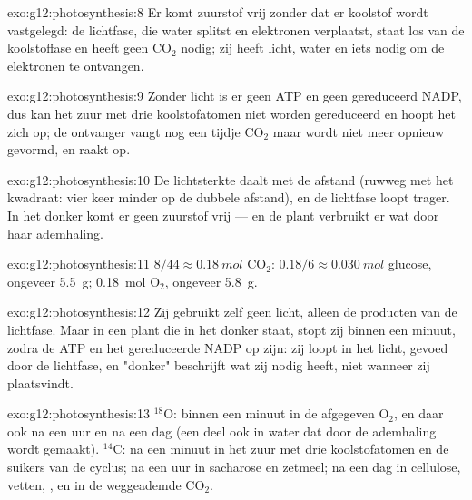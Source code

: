 \begin{solution}{exo:g12:photosynthesis:8}
Er komt zuurstof vrij zonder dat er koolstof wordt vastgelegd: de
lichtfase, die water splitst en elektronen verplaatst, staat los van de
koolstoffase en heeft geen $\mathrm{CO_2}$ nodig; zij heeft licht, water
en iets nodig om de elektronen te ontvangen.
\end{solution}

\begin{solution}{exo:g12:photosynthesis:9}
Zonder licht is er geen ATP en geen gereduceerd NADP, dus kan het zuur met
drie koolstofatomen niet worden gereduceerd en hoopt het zich op; de
ontvanger vangt nog een tijdje $\mathrm{CO_2}$ maar wordt niet meer
opnieuw gevormd, en raakt op.
\end{solution}

\begin{solution}{exo:g12:photosynthesis:10}
De lichtsterkte daalt met de afstand (ruwweg met het kwadraat: vier keer
minder op de dubbele afstand), en de lichtfase loopt trager. In het donker
komt er geen zuurstof vrij --- en de plant verbruikt er wat door haar
ademhaling.
\end{solution}

\begin{solution}{exo:g12:photosynthesis:11}
$8/44 \approx \qty{0.18}{mol}$ $\mathrm{CO_2}$: $0.18/6 \approx
\qty{0.030}{mol}$ glucose, ongeveer \qty{5.5}{g}; \qty{0.18}{mol}
$\mathrm{O_2}$, ongeveer \qty{5.8}{g}.
\end{solution}

\begin{solution}{exo:g12:photosynthesis:12}
Zij gebruikt zelf geen licht, alleen de producten van de lichtfase. Maar
in een plant die in het donker staat, stopt zij binnen een minuut, zodra
de ATP en het gereduceerde NADP op zijn: zij loopt in het licht, gevoed
door de lichtfase, en "donker" beschrijft wat zij nodig heeft, niet
wanneer zij plaatsvindt.
\end{solution}

\begin{solution}{exo:g12:photosynthesis:13}
$^{18}$O: binnen een minuut in de afgegeven $\mathrm{O_2}$, en daar ook na
een uur en na een dag (een deel ook in water dat door de ademhaling wordt
gemaakt). $^{14}$C: na een minuut in het zuur met drie koolstofatomen en
de suikers van de cyclus; na een uur in sacharose en zetmeel; na een dag
in cellulose, vetten, , en in de weggeademde $\mathrm{CO_2}$.
\end{solution}

